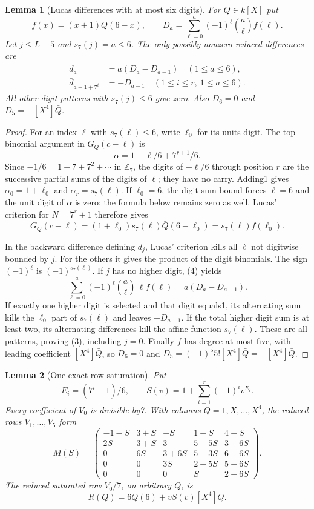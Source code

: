 \documentclass[11pt]{article}
\newtheorem{lemma}{Lemma}
\begin{document}
\begin{lemma}[Lucas differences with at most six digits]\label{lem:digit}
For $\bar Q\in k[X]$ put
\[
 f(x)=(x+1)\bar Q(6-x),\qquad
 D_a=\sum_{\ell=0}^a(-1)^\ell\binom a\ell f(\ell).
\]
Let $j\le L+5$ and $s_7(j)=a\le6$.
The only possibly nonzero reduced differences are
\[
 \begin{split}
 \bar d_a&=a(D_a-D_{a-1})\quad(1\le a\le6),\\
 \bar d_{a-1+7^i}&=-D_{a-1}\quad(1\le i\le r,\ 1\le a\le6).
 \end{split}                                                   \tag{3}
\]
All other digit patterns with $s_7(j)\le6$ give zero.
Also $D_6=0$ and $D_5=-[X^4]\bar Q$.
\end{lemma}
\begin{proof}
For an index $\ell$ with $s_7(\ell)\le6$, write $\ell_0$ for
its units digit. The top binomial argument in $G_Q(c-\ell)$ is
\[
 \alpha=1-\ell/6+7^{r+1}/6 .
\]
Since $-1/6=1+7+7^2+\cdots$ in $\mathbb Z_7$, the digits of
$-\ell/6$ through position $r$ are the successive partial sums
of the digits of $\ell$; they have no carry.
Adding1 gives $\alpha_0=1+\ell_0$ and
$\alpha_r=s_7(\ell)$. If $\ell_0=6$, the digit-sum bound forces
$\ell=6$ and the unit digit of $\alpha$ is zero; the formula
below remains zero as well.
Lucas' criterion for $N=7^r+1$ therefore gives
\[
 \overline{G_Q(c-\ell)}
   =(1+\ell_0)s_7(\ell)\bar Q(6-\ell_0)
   =s_7(\ell)f(\ell_0).                                 \tag{4}
\]

In the backward difference defining $d_j$, Lucas' criterion
kills all $\ell$ not digitwise bounded by $j$.
For the others it gives the product of the digit binomials.
The sign $(-1)^\ell$ is $(-1)^{s_7(\ell)}$.
If $j$ has no higher digit, (4) yields
\[
 \sum_{\ell=0}^a(-1)^\ell\binom a\ell\,\ell f(\ell)
                       =a(D_a-D_{a-1}).
\]
If exactly one higher digit is selected and that digit equals1,
its alternating sum kills the $\ell_0$ part of $s_7(\ell)$
and leaves $-D_{a-1}$.
If the total higher digit sum is at least two, its alternating
differences kill the affine function $s_7(\ell)$.
These are all patterns, proving (3), including $j=0$.
Finally $f$ has degree at most five, with leading coefficient
$[X^4]\bar Q$, so $D_6=0$ and
$D_5=(-1)^5 5![X^4]\bar Q=-[X^4]\bar Q$.
\end{proof}

\begin{lemma}[One exact row saturation]\label{lem:matrix}
Put
\[
 E_i=(7^i-1)/6,\qquad
 S(v)=1+\sum_{i=1}^r(-1)^i v^{E_i}.
\]
Every coefficient of $V_0$ is divisible by7.
With columns $Q=1,X,\ldots,X^4$, the reduced rows
$V_1,\ldots,V_5$ form
\[
 M(S)=\begin{pmatrix}
 -1-S&3+S&-S&1+S&4-S\\
 2S&3+S&3&5+5S&3+6S\\
 0&6S&3+6S&5+3S&6+6S\\
 0&0&3S&2+5S&5+6S\\
 0&0&0&S&2+6S
 \end{pmatrix}.                                        \tag{6}
\]
The reduced saturated row $V_0/7$, on arbitrary $Q$, is
\[
                    R(Q)=6Q(6)+vS(v)[X^4]Q.             \tag{7}
\]
\end{lemma}
\end{document}
